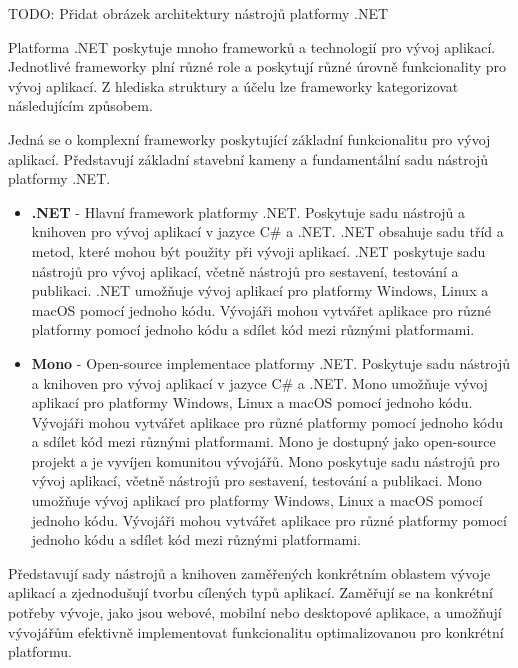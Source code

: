 TODO: Přidat obrázek architektury nástrojů platformy .NET


Platforma .NET poskytuje mnoho frameworků a technologií pro vývoj aplikací. Jednotlivé frameworky plní různé role a poskytují různé úrovně funkcionality pro vývoj aplikací. Z hlediska struktury a účelu lze frameworky kategorizovat následujícím způsobem.


Jedná se o komplexní frameworky poskytující základní funkcionalitu pro vývoj aplikací. Představují základní stavební kameny a fundamentální sadu nástrojů platformy .NET.

\begin{itemize}
    \item \textbf{.NET} - Hlavní framework platformy .NET. Poskytuje sadu nástrojů a knihoven pro vývoj aplikací v jazyce C\# a .NET. .NET obsahuje sadu tříd a metod, které mohou být použity při vývoji aplikací. .NET poskytuje sadu nástrojů pro vývoj aplikací, včetně nástrojů pro sestavení, testování a publikaci. .NET umožňuje vývoj aplikací pro platformy Windows, Linux a macOS pomocí jednoho kódu. Vývojáři mohou vytvářet aplikace pro různé platformy pomocí jednoho kódu a sdílet kód mezi různými platformami.
    \item \textbf{Mono} - Open-source implementace platformy .NET. Poskytuje sadu nástrojů a knihoven pro vývoj aplikací v jazyce C\# a .NET. Mono umožňuje vývoj aplikací pro platformy Windows, Linux a macOS pomocí jednoho kódu. Vývojáři mohou vytvářet aplikace pro různé platformy pomocí jednoho kódu a sdílet kód mezi různými platformami. Mono je dostupný jako open-source projekt a je vyvíjen komunitou vývojářů. Mono poskytuje sadu nástrojů pro vývoj aplikací, včetně nástrojů pro sestavení, testování a publikaci. Mono umožňuje vývoj aplikací pro platformy Windows, Linux a macOS pomocí jednoho kódu. Vývojáři mohou vytvářet aplikace pro různé platformy pomocí jednoho kódu a sdílet kód mezi různými platformami.
\end{itemize}


Představují sady nástrojů a knihoven zaměřených konkrétním oblastem vývoje aplikací a zjednodušují tvorbu cílených typů aplikací. Zaměřují se na konkrétní potřeby vývoje, jako jsou webové, mobilní nebo desktopové aplikace, a umožňují vývojářům efektivně implementovat funkcionalitu optimalizovanou pro konkrétní platformu. 

